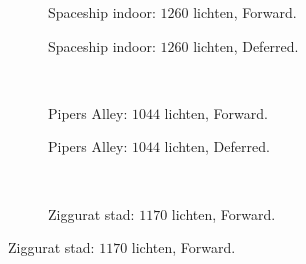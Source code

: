 \begin{figure}[t]
  \begin{adjustbox}{minipage=\textwidth, scale=0.6}
    \begin{subfigure}[b]{0.83\textwidth}
      \centering
      \def\svgwidth{\textwidth}
      
      \caption{Spaceship indoor: $1260$ lichten, Forward.}
      \label{fig:ts-resolution-forward:indoor}
    \end{subfigure}
  \end{adjustbox} %
  \begin{adjustbox}{minipage=\textwidth, scale=0.6}
    \begin{subfigure}[b]{0.83\textwidth}
      \centering
      \def\svgwidth{\textwidth}
      
      \caption{Spaceship indoor: $1260$ lichten, Deferred.}
      \label{fig:ts-resolution-deferred:indoor}
    \end{subfigure}
  \end{adjustbox} \\
  \begin{adjustbox}{minipage=\textwidth, scale=0.6}
    \begin{subfigure}[b]{0.83\textwidth}
      \centering
      \def\svgwidth{\textwidth}
      
      \caption{Pipers Alley: $1044$ lichten, Forward.}
      \label{fig:ts-resolution-forward:alley}
    \end{subfigure}
  \end{adjustbox} %
  \begin{adjustbox}{minipage=\textwidth, scale=0.6}
    \begin{subfigure}[b]{0.83\textwidth}
      \centering
      \def\svgwidth{\textwidth}
      
      \caption{Pipers Alley: $1044$ lichten, Deferred.}
      \label{fig:ts-resolution-deferred:alley}
    \end{subfigure}
  \end{adjustbox} \\
  \begin{adjustbox}{minipage=\textwidth, scale=0.6}
    \begin{subfigure}[b]{0.83\textwidth}
      \centering
      \def\svgwidth{\textwidth}
      
      \caption{Ziggurat stad: $1170$ lichten, Forward.}

\end{subfigure}
\end{adjustbox}
\end{figure}
